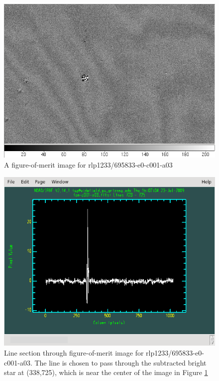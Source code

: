 \begin{figure}[hb]
\begin{center}
\includegraphics{images/rlp1233_v695833-e0-c001-a03-fom_img.png}
\caption{A figure-of-merit image for
  rlp1233/695833-e0-c001-a03}  
\label{fig:diffim2}
\end{center}
\end{figure}

\begin{figure}[hb]
\begin{center}
\includegraphics{images/rlp1233_v695833-e0-c001-a03-fom_plot.png}
\caption{Line section through figure-of-merit image for
  rlp1233/695833-e0-c001-a03.  The line is chosen to pass through the
  subtracted bright star at (338,725), which is near the center of the
image in Figure \ref{fig:diffim2}}  
\label{fig:diffim3}
\end{center}
\end{figure}


